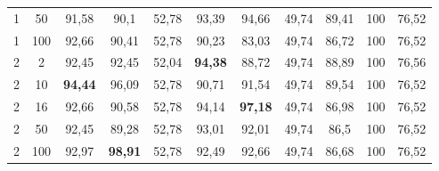\begin{table}[ht]
\begin{tabular}{cc|ccc|ccc|ccc}
        {1}                           & {50}    & {91,58}                             & {90,1}                              & {52,78}                                   & {93,39}                         & {94,66}                         & {49,74}                        & {89,41}                         & {100}                           & {76,52}                        \\
        {1}                           & {100}   & {92,66}                             & {90,41}                             & {52,78}                                   & {90,23}                         & {83,03}                         & {49,74}                        & {86,72}                         & {100}                           & {76,52}                        \\
        {2}                           & {2}     & {92,45}                             & {92,45}                             & {52,04}                                   & \textbf{94,38}                  & {88,72}                         & {49,74}                        & {88,89}                         & {100}                           & {76,56}                        \\
        {2}                           & {10}    & {\textbf{94,44}}                    & {96,09}                             & {52,78}                                   & {90,71}                         & {91,54}                         & {49,74}                        & {89,54}                         & {100}                           & {76,52}                        \\
        {2}                           & {16}    & {92,66}                             & {90,58}                             & {52,78}                                   & {94,14}                         & \textbf{97,18}                  & {49,74}                        & {86,98}                         & {100}                           & {76,52}                        \\
        {2}                           & {50}    & {92,45}                             & {89,28}                             & {52,78}                                   & {93,01}                         & {92,01}                         & {49,74}                        & {86,5}                          & {100}                           & {76,52}                        \\
        {2}                           & {100}   & {92,97}                             & {\textbf{98,91}}                    & {52,78}                                   & {92,49}                         & {92,66}                         & {49,74}                        & {86,68}                         & {100}                           & {76,52}                        \\

\end{tabular}
\end{table}
